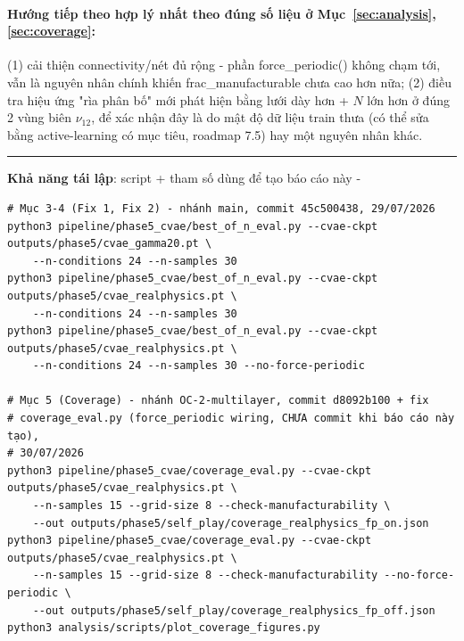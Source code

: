 \documentclass[11pt,a4paper]{article}
\begin{document}
\paragraph{Hướng tiếp theo hợp lý nhất theo đúng số liệu ở Mục~\ref{sec:analysis},
\ref{sec:coverage}:} (1) cải thiện connectivity/nét đủ rộng - phần force\_periodic() không chạm
tới, vẫn là nguyên nhân chính khiến frac\_manufacturable chưa cao hơn nữa; (2) điều tra hiệu ứng
"rìa phân bố" mới phát hiện bằng lưới dày hơn + $N$ lớn hơn ở đúng 2 vùng biên $\nu_{12}$, để xác
nhận đây là do mật độ dữ liệu train thưa (có thể sửa bằng active-learning có mục tiêu, roadmap
7.5) hay một nguyên nhân khác.

\vspace{1cm}
\noindent\rule{\linewidth}{0.4pt}
\small\color{inkMuted}
\textbf{Khả năng tái lập}: script + tham số dùng để tạo báo cáo này -
\begin{verbatim}
# Mục 3-4 (Fix 1, Fix 2) - nhánh main, commit 45c500438, 29/07/2026
python3 pipeline/phase5_cvae/best_of_n_eval.py --cvae-ckpt outputs/phase5/cvae_gamma20.pt \
    --n-conditions 24 --n-samples 30
python3 pipeline/phase5_cvae/best_of_n_eval.py --cvae-ckpt outputs/phase5/cvae_realphysics.pt \
    --n-conditions 24 --n-samples 30
python3 pipeline/phase5_cvae/best_of_n_eval.py --cvae-ckpt outputs/phase5/cvae_realphysics.pt \
    --n-conditions 24 --n-samples 30 --no-force-periodic

# Mục 5 (Coverage) - nhánh OC-2-multilayer, commit d8092b100 + fix
# coverage_eval.py (force_periodic wiring, CHƯA commit khi báo cáo này tạo),
# 30/07/2026
python3 pipeline/phase5_cvae/coverage_eval.py --cvae-ckpt outputs/phase5/cvae_realphysics.pt \
    --n-samples 15 --grid-size 8 --check-manufacturability \
    --out outputs/phase5/self_play/coverage_realphysics_fp_on.json
python3 pipeline/phase5_cvae/coverage_eval.py --cvae-ckpt outputs/phase5/cvae_realphysics.pt \
    --n-samples 15 --grid-size 8 --check-manufacturability --no-force-periodic \
    --out outputs/phase5/self_play/coverage_realphysics_fp_off.json
python3 analysis/scripts/plot_coverage_figures.py
\end{verbatim}
\end{document}

